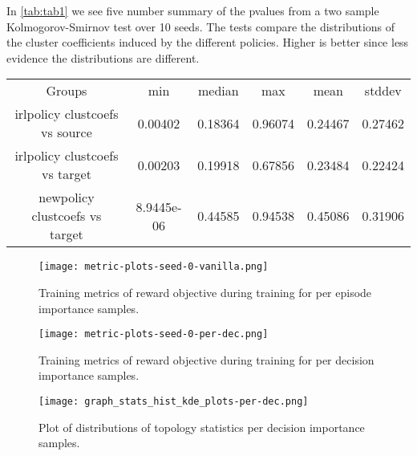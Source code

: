 \documentclass{report}
\numberwithin{equation}{section}
\numberwithin{figure}{section}
\numberwithin{table}{section}
\numberwithin{algorithm}{section}
\begin{document}
In \ref{tab:tab1} we see five number summary of the pvalues 
from a two sample Kolmogorov-Smirnov test over 10 seeds.
The tests compare the distributions of the cluster coefficients 
induced by the different policies. Higher is better since 
less evidence the distributions are different.
\begin{center}\label{tab:tab1}  
  \begin{tabular}{|c|c|c|c|c|c|}
    \hline
    Groups & min & median & max & mean & stddev\\
    irlpolicy clustcoefs vs source  & 0.00402 & 0.18364 & 0.96074 &  0.24467 & 0.27462\\
    irlpolicy clustcoefs vs target  & 0.00203 & 0.19918 & 0.67856 & 0.23484 & 0.22424\\
    newpolicy clustcoefs vs target & 8.9445e-06 & 0.44585 & 0.94538 & 0.45086 & 0.31906\\
    \hline
  \end{tabular}
  
\end{center}

\begin{figure}
  \texttt{[image: metric-plots-seed-0-vanilla.png]}
  \caption{Training metrics of reward objective during training for 
  per episode importance samples.}
\end{figure}

\begin{figure}
  \texttt{[image: metric-plots-seed-0-per-dec.png]}
  \caption{Training metrics of reward objective during training for 
  per decision importance samples.}
\end{figure}

\begin{figure}[H]
  \texttt{[image: graph\_stats\_hist\_kde\_plots-per-dec.png]}
  \caption{Plot of distributions of topology statistics 
  per decision importance samples.}
\end{figure}

\end{document}

